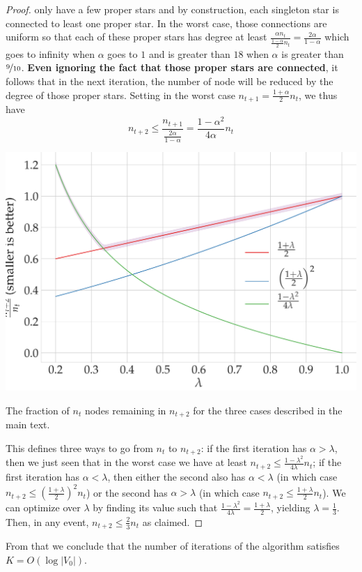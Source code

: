 {\begin{proof}
  only have a few proper stars and by construction, each singleton star is connected to least one proper star.
  In the worst case, those connections are uniform so that each of these proper stars has degree at least
  $\frac{\alpha n_t}{\frac{1-\alpha}{2}n_t} = \frac{2\alpha}{1-\alpha}$ which goes to infinity when
  $\alpha$ goes to $1$ and is greater than $18$ when $\alpha$ is greater than $\nicefrac{9}{10}$.
  \textbf{Even ignoring the fact that those proper stars are connected}, it follows that in the next
  iteration, the number of node will be reduced by the degree of those proper stars. Setting in the
  worst case $n_{t+1}=\frac{1+\alpha}{2}n_t$, we thus have $$n_{t+2} \leq
  \frac{n_{t+1}}{\frac{2\alpha}{1-\alpha}} = \frac{1-\alpha^2}{4\alpha}n_t$$
  \begin{marginfigure}
    \centering
    \includegraphics[width=\linewidth]{assets/tmp-code/gtx_reduc.pdf}
    \caption{The fraction of $n_t$ nodes remaining in $n_{t+2}$ for the three cases described in the
    main text.}
  \end{marginfigure}
  This defines three ways to go from $n_t$ to $n_{t+2}$: if the first iteration has $\alpha>\lambda$,
  then we just seen that in the worst case we have at least $n_{t+2}\leq
  \frac{1-\lambda^2}{4\lambda}n_t$; if the first iteration has $\alpha < \lambda$, then either the
  second also has  $\alpha < \lambda$ (in which case $n_{t+2}\leq
  \left(\frac{1+\lambda}{2}\right)^2n_t$) or the second has $\alpha>\lambda$ (in which case
  $n_{t+2}\leq \frac{1+\lambda}{2}n_t$). We can optimize over $\lambda$ by finding its value such
  that $\frac{1-\lambda^2}{4\lambda}=\frac{1+\lambda}{2}$, yielding $\lambda = \frac{1}{3}$. Then,
  in any event, $n_{t+2}\leq \frac{2}{3}n_t$ as claimed.
\end{proof}

From that we conclude that the number of iterations of the \gtx{} algorithm satisfies $K=O(\log
|V_0|)$.}
